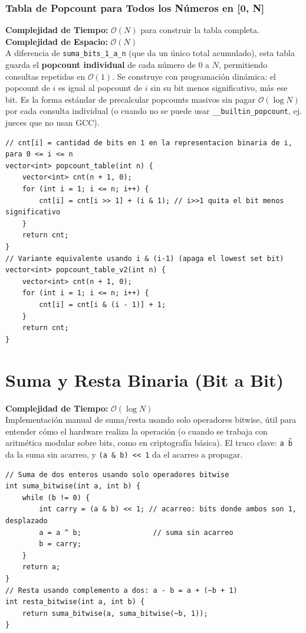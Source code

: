 \documentclass[10pt,twocolumn,letterpaper]{report}
\begin{document}
\subsubsection{Tabla de Popcount para Todos los Números en [0, N]}
\textbf{Complejidad de Tiempo:} $\mathcal{O}(N)$ para construir la tabla completa. \\
\textbf{Complejidad de Espacio:} $\mathcal{O}(N)$ \\
A diferencia de \texttt{suma\_bits\_1\_a\_n} (que da un único total acumulado), esta tabla guarda el \textbf{popcount individual} de cada número de $0$ a $N$, permitiendo consultas repetidas en $\mathcal{O}(1)$. Se construye con programación dinámica: el popcount de $i$ es igual al popcount de $i$ sin su bit menos significativo, más ese bit. Es la forma estándar de precalcular popcounts masivos sin pagar $\mathcal{O}(\log N)$ por cada consulta individual (o cuando no se puede usar \texttt{\_\_builtin\_popcount}, ej. jueces que no usan GCC).
\begin{lstlisting}
// cnt[i] = cantidad de bits en 1 en la representacion binaria de i, para 0 <= i <= n
vector<int> popcount_table(int n) {
    vector<int> cnt(n + 1, 0);
    for (int i = 1; i <= n; i++) {
        cnt[i] = cnt[i >> 1] + (i & 1); // i>>1 quita el bit menos significativo
    }
    return cnt;
}
// Variante equivalente usando i & (i-1) (apaga el lowest set bit)
vector<int> popcount_table_v2(int n) {
    vector<int> cnt(n + 1, 0);
    for (int i = 1; i <= n; i++) {
        cnt[i] = cnt[i & (i - 1)] + 1;
    }
    return cnt;
}
\end{lstlisting}
\section{Suma y Resta Binaria (Bit a Bit)}
\textbf{Complejidad de Tiempo:} $\mathcal{O}(\log N)$ \\
Implementación manual de suma/resta usando solo operadores bitwise, útil para entender cómo el hardware realiza la operación (o cuando se trabaja con aritmética modular sobre bits, como en criptografía básica). El truco clave: \texttt{a \^ b} da la suma sin acarreo, y \texttt{(a \& b) << 1} da el acarreo a propagar.
\begin{lstlisting}
// Suma de dos enteros usando solo operadores bitwise
int suma_bitwise(int a, int b) {
    while (b != 0) {
        int carry = (a & b) << 1; // acarreo: bits donde ambos son 1, desplazado
        a = a ^ b;                 // suma sin acarreo
        b = carry;
    }
    return a;
}
// Resta usando complemento a dos: a - b = a + (~b + 1)
int resta_bitwise(int a, int b) {
    return suma_bitwise(a, suma_bitwise(~b, 1));
}
\end{lstlisting}
\end{document}
